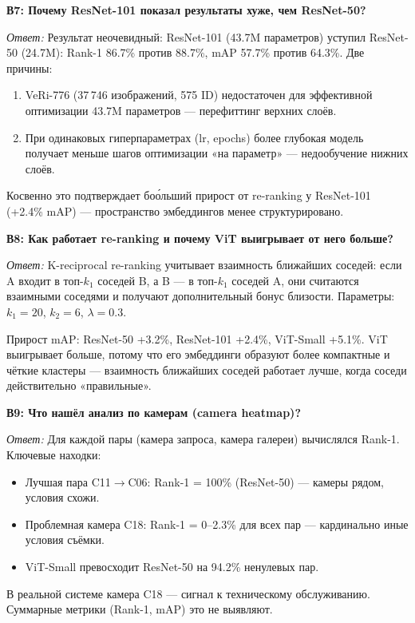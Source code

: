 \documentclass[a4paper, 12pt]{article}
\begin{document}
\vspace{1em}
\textbf{В7: Почему ResNet-101 показал результаты хуже, чем ResNet-50?}

\textit{Ответ:} Результат неочевидный: ResNet-101 (43.7M параметров) уступил ResNet-50 (24.7M): Rank-1 86.7\% против 88.7\%, mAP 57.7\% против 64.3\%. Две причины:
\begin{enumerate}
  \item VeRi-776 (37\,746 изображений, 575 ID) недостаточен для эффективной оптимизации 43.7M параметров --- перефиттинг верхних слоёв.
  \item При одинаковых гиперпараметрах (lr, epochs) более глубокая модель получает меньше шагов оптимизации «на параметр» --- недообучение нижних слоёв.
\end{enumerate}
Косвенно это подтверждает бо\'{о}льший прирост от re-ranking у ResNet-101 (+2.4\% mAP) --- пространство эмбеддингов менее структурировано.

\vspace{1em}
\textbf{В8: Как работает re-ranking и почему ViT выигрывает от него больше?}

\textit{Ответ:} K-reciprocal re-ranking учитывает взаимность ближайших соседей: если A входит в топ-$k_1$ соседей B, а B --- в топ-$k_1$ соседей A, они считаются взаимными соседями и получают дополнительный бонус близости. Параметры: $k_1=20$, $k_2=6$, $\lambda=0.3$.

Прирост mAP: ResNet-50 +3.2\%, ResNet-101 +2.4\%, ViT-Small +5.1\%. ViT выигрывает больше, потому что его эмбеддинги образуют более компактные и чёткие кластеры --- взаимность ближайших соседей работает лучше, когда соседи действительно «правильные».

\vspace{1em}
\textbf{В9: Что нашёл анализ по камерам (camera heatmap)?}

\textit{Ответ:} Для каждой пары (камера запроса, камера галереи) вычислялся Rank-1. Ключевые находки:
\begin{itemize}
  \item Лучшая пара C11$\to$C06: Rank-1 = 100\% (ResNet-50) --- камеры рядом, условия схожи.
  \item Проблемная камера C18: Rank-1 = 0--2.3\% для всех пар --- кардинально иные условия съёмки.
  \item ViT-Small превосходит ResNet-50 на 94.2\% ненулевых пар.
\end{itemize}
В реальной системе камера C18 --- сигнал к техническому обслуживанию. Суммарные метрики (Rank-1, mAP) это не выявляют.
\end{document}
